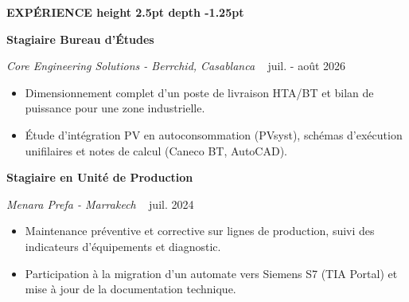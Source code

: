 \documentclass[10pt,a4paper]{altacv}
\renewcommand{\cvsection}[2][]{%
  \vspace{2.5pt}%
  {\color{heading}\Large\bfseries #2 \hspace{0.2em}\leaders\vrule height 2.5pt depth -1.25pt\hfill\mbox{}}\par\vspace{2pt}
}
\renewcommand{\cvevent}[4]{%
  {\normalsize\bfseries\color{accent}#1\par}\vspace{1pt}
  \ifstrequal{#2}{}{}{%
    {\small\itshape\color{emphasis}#2\ifstrequal{#4}{}{}{ - #4}}%
  }%
  ~\hfill
  \ifstrequal{#3}{}{}{{\small\color{emphasis}#3}}%
  \par\vspace{1.5pt}
}
\begin{document}
\cvsection{EXPÉRIENCE}
\cvevent{Stagiaire Bureau d’Études}{Core Engineering Solutions}{juil. - août 2026}{Berrchid, Casablanca}
\begin{itemize}[leftmargin=*, label=\textbullet, nosep, itemsep=1pt]
  \item Dimensionnement complet d’un poste de livraison HTA/BT et bilan de puissance pour une zone industrielle.
  \item Étude d’intégration PV en autoconsommation (PVsyst), schémas d’exécution unifilaires et notes de calcul (Caneco BT, AutoCAD).
\end{itemize}
\vspace{1pt}
\cvevent{Stagiaire en Unité de Production}{Menara Prefa}{juil. 2024}{Marrakech}
\begin{itemize}[leftmargin=*, label=\textbullet, nosep, itemsep=1pt]
  \item Maintenance préventive et corrective sur lignes de production, suivi des indicateurs d’équipements et diagnostic.
  \item Participation à la migration d’un automate vers Siemens S7 (TIA Portal) et mise à jour de la documentation technique.
\end{itemize}
\end{document}
